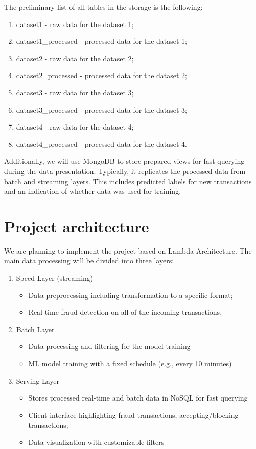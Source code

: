 \documentclass[12pt,a4paper, hidelinks]{article}
\begin{document}
The preliminary list of all tables in the storage is the following:

\begin{enumerate}
    \item dataset1 - raw data for the dataset 1;
    \item dataset1\_processed - processed data for the dataset 1;
    \item dataset2 - raw data for the dataset 2;
    \item dataset2\_processed - processed data for the dataset 2;
    \item dataset3 - raw data for the dataset 3;
    \item dataset3\_processed - processed data for the dataset 3;
    \item dataset4 - raw data for the dataset 4;
    \item dataset4\_processed - processed data for the dataset 4.
\end{enumerate}

Additionally, we will use MongoDB to store prepared views for fast querying during the data presentation. Typically, it replicates the processed data from batch and streaming layers. This includes predicted labels for new transactions and an indication of whether data was used for training.


\section{Project architecture}

We are planning to implement the project based on Lambda Architecture. The main data processing will be divided into three layers:

\begin{enumerate}
    \item Speed Layer (streaming)
        \begin{itemize}
            \item Data preprocessing including transformation to a specific format;
            \item Real-time fraud detection on all of the incoming transactions.
        \end{itemize}
    \item Batch Layer
        \begin{itemize}
            \item Data processing and filtering for the model training
            \item ML model training with a fixed schedule (e.g., every 10 minutes)
        \end{itemize}
    \item Serving Layer
        \begin{itemize}
            \item Stores processed real-time and batch data in NoSQL for fast querying
            \item Client interface highlighting fraud transactions, accepting/blocking transactions;
            \item Data visualization with customizable filters
        \end{itemize}
\end{enumerate}
\end{document}
